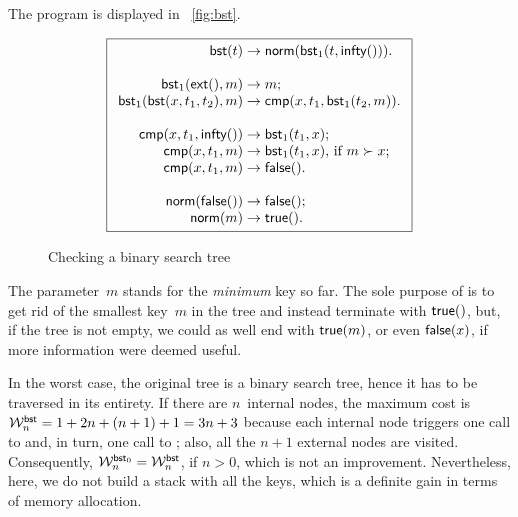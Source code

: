 The program is displayed in
\fig~\vref{fig:bst}.
\begin{figure}[t]
\begin{equation*}
\boxed{
\begin{array}{r@{\;}l@{\;}l}
  \fun{bst}(t) & \rightarrow & \fun{norm}(\fun{bst}_1(t,\fun{infty}())).\\
  \\
  \fun{bst}_1(\fun{ext}(),m) & \rightarrow & m;\\
  \fun{bst}_1(\fun{bst}(x,t_1,t_2),m) & \rightarrow & 
  \fun{cmp}(x,t_1,\fun{bst}_1(t_2,m)).\\
\\
\fun{cmp}(x,t_1,\fun{infty}()) & \rightarrow & \fun{bst}_1(t_1,x);\\
\fun{cmp}(x,t_1,m) & \rightarrow &
  \fun{bst}_1(t_1,x), \,\text{if \(m \succ x\)};\\
\fun{cmp}(x,t_1,m) & \rightarrow & \fun{false}().\\
\\
\fun{norm}(\fun{false}()) & \rightarrow & \fun{false}();\\
\fun{norm}(m) & \rightarrow & \fun{true}().
\end{array}}
\end{equation*}
\caption{Checking a binary search tree\label{fig:bst}}
\end{figure}
The parameter~\(m\) stands for the \emph{minimum} key so far. The sole
purpose of  is to get rid of the
smallest key~\(m\) in the tree and instead terminate with
\(\fun{true}()\), but, if the tree is not empty, we could as well end
with \(\fun{true}(m)\), or even \(\fun{false}(x)\), if more
information were deemed useful.

In the worst case, the original tree is a binary search tree, hence it
has to be traversed in its entirety. If there are \(n\)~internal
nodes, the maximum cost is \(\W{\fun{bst}}{n} = 1 + 2n + (n+1) + 1 =
3n + 3\) because each internal node
triggers one call to  and, in
turn, one call to ; also, all the
\(n+1\) external nodes are visited. Consequently, \(\W{\fun{bst}_0}{n}
= \W{\fun{bst}}{n}\), if \(n > 0\),
which is not an improvement. Nevertheless, here, we do not build a
stack with all the keys, which is a definite gain in terms of memory
allocation.

